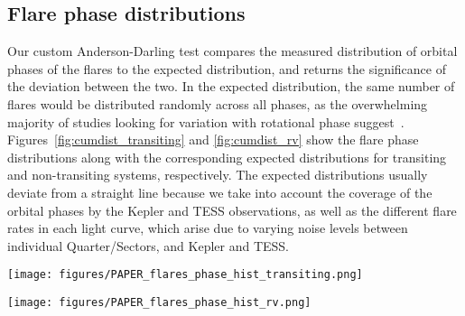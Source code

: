 \documentclass[twocolumn]{aastex631}
\begin{document}
\subsection{Flare phase distributions}
\label{sec:results:phasedist}
Our custom Anderson-Darling test compares the measured distribution of orbital phases of the flares to the expected distribution, and returns the significance of the deviation between the two. In the expected distribution, the same number of flares would be distributed randomly across all phases, as the overwhelming majority of studies looking for variation with rotational phase suggest~\citep[see, e.g.,][]{doyle2018investigating,howard2021evryflare}. Figures~\ref{fig:cumdist_transiting} and \ref{fig:cumdist_rv} show the flare phase distributions along with the corresponding expected distributions for transiting and non-transiting systems, respectively. The expected distributions usually deviate from a straight line because we take into account the coverage of the orbital phases by the Kepler and TESS observations, as well as the different flare rates in each light curve, which arise due to varying noise levels between individual Quarter/Sectors, and Kepler and TESS.

\begin{figure*}[ht!]
    \begin{centering}
        \texttt{[image: figures/PAPER\_flares\_phase\_hist\_transiting.png]}
        \caption{
            Cumulative distributions of orbital phases of flares in the \textit{transiting} planet hosts observed by Kepler and TESS, sorted by number of flares from top to bottom. The bisector line is dotted, the expected distribution is solid blue, and the observed distribution is solid black. Phase zero corresponds to the transit mid-time of the planet. 
        }
        \label{fig:cumdist_transiting}
    \end{centering}
\end{figure*}

\begin{figure*}[ht!]
    \begin{centering}
        \texttt{[image: figures/PAPER\_flares\_phase\_hist\_rv.png]}
        \caption{
            Cumulative distributions of orbital phases of flares in the \textit{non-transiting} planet hosts observed by Kepler and TESS, sorted by number of flares from top to bottom. The bisector line is dotted, the expected distribution is solid blue, and the observed distribution is solid black. Phase zero is chosen arbitrarily. 
        }
        \label{fig:cumdist_rv}
    \end{centering}
\end{figure*}
\end{document}

